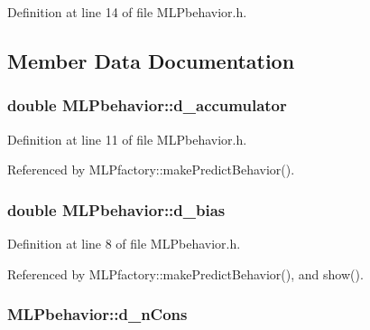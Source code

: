 Definition at line 14 of file MLPbehavior.h.



\subsection{Member Data Documentation}
\hypertarget{class_m_l_pbehavior_a5e3dcaba201554283d27d58c6aa3ea82}{
\subsubsection[{d\_\-accumulator}]{\setlength{\rightskip}{0pt plus 5cm}double {\bf MLPbehavior::d\_\-accumulator}}}
\label{class_m_l_pbehavior_a5e3dcaba201554283d27d58c6aa3ea82}


Definition at line 11 of file MLPbehavior.h.



Referenced by MLPfactory::makePredictBehavior().

\hypertarget{class_m_l_pbehavior_a6206785c5c3f838a0538f9f77fa7a25a}{
\subsubsection[{d\_\-bias}]{\setlength{\rightskip}{0pt plus 5cm}double {\bf MLPbehavior::d\_\-bias}}}
\label{class_m_l_pbehavior_a6206785c5c3f838a0538f9f77fa7a25a}


Definition at line 8 of file MLPbehavior.h.



Referenced by MLPfactory::makePredictBehavior(), and show().

\hypertarget{class_m_l_pbehavior_acb6e9681f06195ba1dd63bbafaa51d68}{
\subsubsection[{d\_\-nCons}]{ {\bf MLPbehavior::d\_\-nCons}}}
\label{class_m_l_pbehavior_acb6e9681f06195ba1dd63bbafaa51d68}



